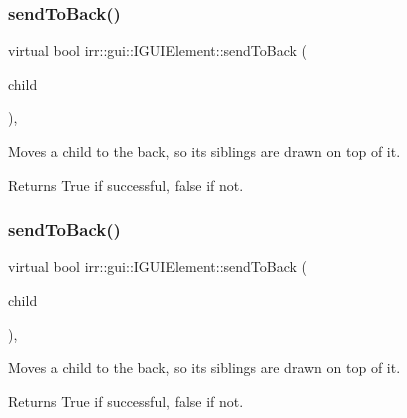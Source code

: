 \subsubsection{\texorpdfstring{send\+To\+Back()}{sendToBack()}\hspace{0.1cm}{\footnotesize\ttfamily [1/2]}}
{\footnotesize\ttfamily virtual bool irr\+::gui\+::\+I\+G\+U\+I\+Element\+::send\+To\+Back (\begin{DoxyParamCaption}\item[{\hyperlink{classirr_1_1gui_1_1IGUIElement}{I\+G\+U\+I\+Element} $\ast$}]{child }\end{DoxyParamCaption})\hspace{0.3cm}{\ttfamily [inline]}, {\ttfamily [virtual]}}



Moves a child to the back, so it\textquotesingle{}s siblings are drawn on top of it. 

\begin{DoxyReturn}{Returns}
True if successful, false if not. 
\end{DoxyReturn}
\mbox{\label{classirr_1_1gui_1_1IGUIElement_a9b1880048e7542dbe289295de69e77cd}} 
\subsubsection{\texorpdfstring{send\+To\+Back()}{sendToBack()}\hspace{0.1cm}{\footnotesize\ttfamily [2/2]}}
{\footnotesize\ttfamily virtual bool irr\+::gui\+::\+I\+G\+U\+I\+Element\+::send\+To\+Back (\begin{DoxyParamCaption}\item[{\hyperlink{classirr_1_1gui_1_1IGUIElement}{I\+G\+U\+I\+Element} $\ast$}]{child }\end{DoxyParamCaption})\hspace{0.3cm}{\ttfamily [inline]}, {\ttfamily [virtual]}}



Moves a child to the back, so it\textquotesingle{}s siblings are drawn on top of it. 

\begin{DoxyReturn}{Returns}
True if successful, false if not. 
\end{DoxyReturn}
\mbox{\label{classirr_1_1gui_1_1IGUIElement_ac575f2f817b05733dbc667ff298f6e78}} 
